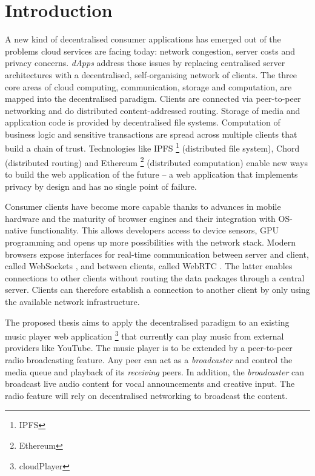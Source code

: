 \section{Introduction}

A new kind of decentralised consumer applications has emerged out of the problems cloud services are facing today: network congestion,
server costs and privacy concerns. \textit{dApps} address those issues by replacing centralised server architectures with a decentralised, self-organising network of clients. The three core areas of cloud computing, communication, storage and computation, are mapped into the decentralised paradigm. Clients are connected via peer-to-peer networking and do distributed content-addressed routing. Storage of media and application code is provided by decentralised file systems. Computation of business logic and sensitive transactions are spread across multiple clients that build a chain of trust. Technologies like IPFS \footnote{IPFS} (distributed file system), Chord \cite{chord} (distributed routing) and Ethereum \footnote{Ethereum} (distributed computation) enable new ways to build the web application of the future – a web application that implements privacy by design and has no single point of failure.

Consumer clients have become more capable thanks to advances in mobile hardware and the maturity of browser engines and their integration with OS-native functionality. This allows developers access to device sensors, GPU programming and opens up more possibilities with the network stack. Modern browsers expose interfaces for real-time communication between server and client, called WebSockets \cite{rfc6455}, and between clients, called WebRTC \cite{webrtc-w3c}. The latter enables connections to other clients without routing the data packages through a central server. Clients can therefore establish a connection to another client by only using the available network infrastructure.

The proposed thesis aims to apply the decentralised paradigm to an existing music player web application \footnote{cloudPlayer} that currently can play music from external providers like YouTube. The music player is to be extended by a peer-to-peer radio broadcasting feature. Any peer can act as a \textit{broadcaster} and control the media queue and playback of its \textit{receiving} peers. In addition, the \textit{broadcaster} can broadcast live audio content for vocal announcements and creative input. The radio feature will rely on decentralised networking to broadcast the content.

